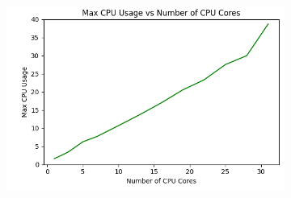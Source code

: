 \documentclass[times, 10pt,twocolumn]{article}
\begin{document}
\begin{figure}[ht]
\begin{subfigure}[b]{0.3\textwidth}
      \includegraphics[width=\textwidth]{imgs/study_1_results/var_cpu/floatmatmul/CPU_CPUUsage.png}
     \caption{}
     \label{fig:plot3}
   \end{subfigure}
   

\end{figure}
\end{document}
